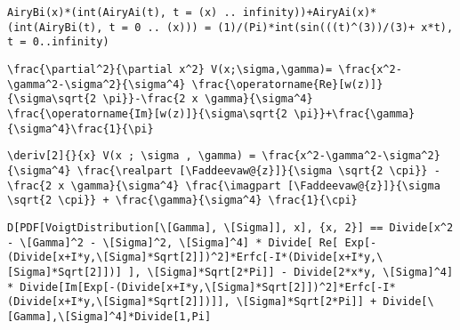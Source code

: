 \newsavebox\BHMA
\begin{lrbox}{\BHMA}
 \begin{minipage}[t]{0.82\textwidth}
  \lstinline[language={[latex]TeX},mathescape,breaklines=true]"AiryBi(x)*(int(AiryAi(t), t = (x) .. infinity))+AiryAi(x)*(int(AiryBi(t), t = 0 .. (x))) = (1)/(Pi)*int(sin(((t)^(3))/(3)+ x*t), t = 0..infinity)"
 \end{minipage}
\end{lrbox}
\newsavebox\BIT
\begin{lrbox}{\BIT}
 \begin{minipage}[t]{0.82\textwidth}
  \lstinline[language={[latex]TeX},mathescape,breaklines=true]"\frac{\partial^2}{\partial x^2} V(x;\sigma,\gamma)= \frac{x^2-\gamma^2-\sigma^2}{\sigma^4} \frac{\operatorname{Re}[w(z)]}{\sigma\sqrt{2 \pi}}-\frac{2 x \gamma}{\sigma^4} \frac{\operatorname{Im}[w(z)]}{\sigma\sqrt{2 \pi}}+\frac{\gamma}{\sigma^4}\frac{1}{\pi}"
 \end{minipage}
\end{lrbox}
\newsavebox\BIST
\begin{lrbox}{\BIST}
 \begin{minipage}[t]{0.82\textwidth}
  \lstinline[language={[latex]TeX},mathescape,breaklines=true]"\deriv[2]{}{x} V(x ; \sigma , \gamma) = \frac{x^2-\gamma^2-\sigma^2}{\sigma^4} \frac{\realpart [\Faddeevaw@{z}]}{\sigma \sqrt{2 \cpi}} - \frac{2 x \gamma}{\sigma^4} \frac{\imagpart [\Faddeevaw@{z}]}{\sigma \sqrt{2 \cpi}} + \frac{\gamma}{\sigma^4} \frac{1}{\cpi}"
 \end{minipage}
\end{lrbox}
\newsavebox\BIMM
\begin{lrbox}{\BIMM}
 \begin{minipage}[t]{0.82\textwidth}
  \lstinline[language={[latex]TeX},mathescape,breaklines=true]"D[PDF[VoigtDistribution[\[Gamma], \[Sigma]], x], {x, 2}] == Divide[x^2 - \[Gamma]^2 - \[Sigma]^2, \[Sigma]^4] * Divide[ Re[ Exp[-(Divide[x+I*y,\[Sigma]*Sqrt[2]])^2]*Erfc[-I*(Divide[x+I*y,\[Sigma]*Sqrt[2]])] ], \[Sigma]*Sqrt[2*Pi]] - Divide[2*x*y, \[Sigma]^4] * Divide[Im[Exp[-(Divide[x+I*y,\[Sigma]*Sqrt[2]])^2]*Erfc[-I*(Divide[x+I*y,\[Sigma]*Sqrt[2]])]], \[Sigma]*Sqrt[2*Pi]] + Divide[\[Gamma],\[Sigma]^4]*Divide[1,Pi]"
 \end{minipage}
\end{lrbox}
\newsavebox\BIMA
\begin{lrbox}{\BIMA}
 \begin{minipage}[t]{0.82\textwidth}
  \lstinline[language={[latex]TeX},mathescape,breaklines=true]""
 \end{minipage}
\end{lrbox}
